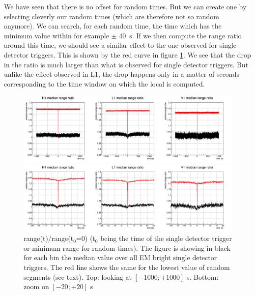 We have seen that there is no offset for random times.
But we can create one by selecting cleverly our random times (which are therefore not so random anymore).
We can search, for each random time, the time which has the minimum \medr{} value within for example $\pm$ \SI{40}{s}.
If we then compute the range ratio around this time, we should see a similar effect to the one observed for single detector triggers.
This is shown by the red curve in figure \ref{fig:rangeOverTime}.
We see that the drop in the ratio is much larger than what is observed for single detector triggers.
But unlike the effect observed in L1, the drop happens only in a matter of seconds corresponding to the time window on which the local \medr{} is computed.
%
\begin{figure}[H]
  \centering
  \begin{minipage}{\linewidth}
    \centering
    \includegraphics[width=\linewidth]{sectionBadTriggers/PSD/Range/range_ratio/cAroundCompare.png}
  \end{minipage}
  \begin{minipage}{\linewidth}
    \centering
    \includegraphics[width=\linewidth]{sectionBadTriggers/PSD/Range/range_ratio/cAroundCompare_zoom.png}
  \end{minipage}
  \caption{range(t)/range(t$_0$=0) (t$_0$ being the time of the single detector trigger or minimum range for random times). The figure is showing in black for each bin the median value over all EM bright single detector triggers. The red line shows the same for the lowest value of random segments (see text). Top: looking at $\left[-1000; +1000\right]$ s. Bottom: zoom on $\left[-20; +20\right]$ s}
  \label{fig:rangeOverTime}
\end{figure}




